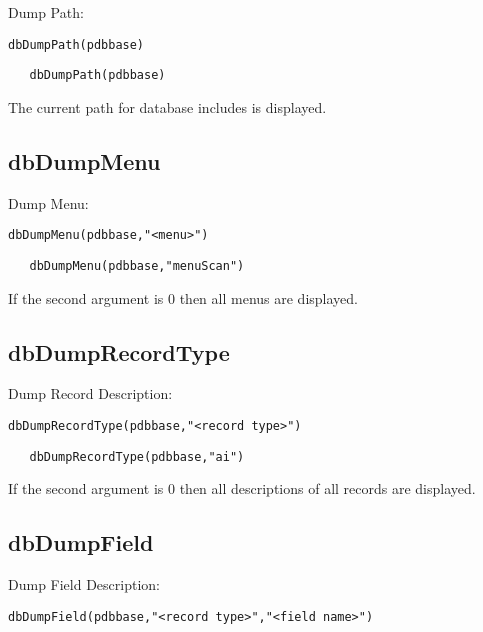 Dump Path:

\begin{verbatim}
dbDumpPath(pdbbase)
\end{verbatim}

\begin{verbatim}
   dbDumpPath(pdbbase)
\end{verbatim}

The current path for database includes is displayed.

\subsection{dbDumpMenu}

Dump Menu:

\begin{verbatim}
dbDumpMenu(pdbbase,"<menu>")
\end{verbatim}

\begin{verbatim}
   dbDumpMenu(pdbbase,"menuScan")
\end{verbatim}

If the second argument is 0 then all menus are displayed.



\subsection{dbDumpRecordType}

Dump Record Description:

\begin{verbatim}
dbDumpRecordType(pdbbase,"<record type>")
\end{verbatim}

\begin{verbatim}
   dbDumpRecordType(pdbbase,"ai")
\end{verbatim}

If the second argument is 0 then all descriptions of all records are displayed.

\subsection{dbDumpField}

Dump Field Description:

\begin{verbatim}
dbDumpField(pdbbase,"<record type>","<field name>")
\end{verbatim}

